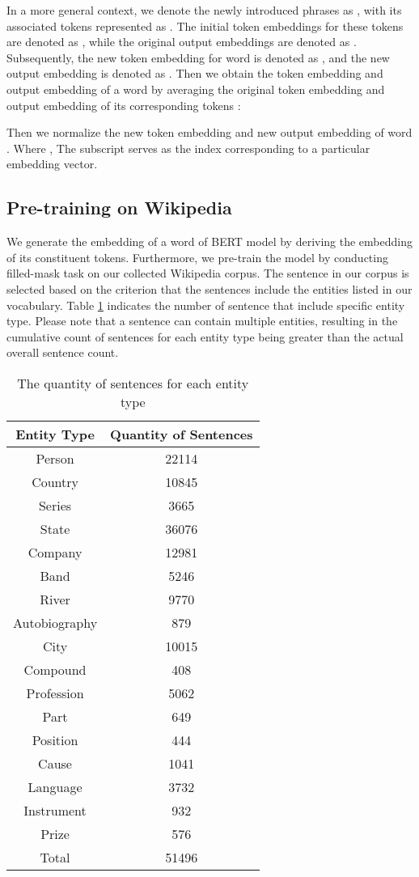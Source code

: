 \documentclass[]{ceurart}
\begin{document}
In a more general context, we denote the newly introduced phrases as , with its associated tokens represented as . The initial token embeddings for these tokens are denoted as , while the original output embeddings are denoted as . Subsequently, the new token embedding for word  is denoted as , and the new output embedding is denoted as .
Then we obtain the token embedding and output embedding of a word  by averaging the original token embedding  and output embedding  of its corresponding tokens :





Then we normalize the new token embedding  and new output embedding  of word . Where , The subscript  serves as the index corresponding to a particular embedding vector. 




\subsection{Pre-training on Wikipedia }
We generate the embedding of a word of BERT model by deriving the embedding of its constituent tokens. Furthermore, we pre-train the model by conducting filled-mask task on our collected Wikipedia corpus. The sentence in our corpus is selected based on the criterion that the sentences include the entities listed in our vocabulary. Table \ref{tab-corpus} indicates the number of sentence that include specific entity type. Please note that a sentence can contain multiple entities, resulting in the cumulative count of sentences for each entity type being greater than the actual overall sentence count.

\begin{table}
\caption{The quantity of sentences for each entity type}\label{tab-corpus}
\begin{tabular}{|c|c|}
\hline
Entity Type & Quantity of Sentences \\
\hline
Person & 22114 \\
Country & 10845 \\
Series & 3665 \\
State & 36076 \\
Company & 12981 \\
Band & 5246 \\
River & 9770 \\
Autobiography & 879 \\
City & 10015 \\
Compound & 408 \\
Profession & 5062 \\
Part & 649 \\
Position & 444 \\
Cause & 1041 \\
Language & 3732 \\
Instrument & 932 \\
Prize & 576 \\
\hline
Total & 51496\\
\hline
\end{tabular}
\end{table}
\end{document}
